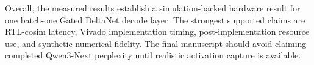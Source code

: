 \begin{table}[t]
\centering
\caption{Recurrent-state storage and off-chip traffic accounting for MXFP4
$B=32$.}
\label{tab:results-state-traffic}

\end{table}

Overall, the measured results establish a simulation-backed hardware result for
one batch-one Gated DeltaNet decode layer. The strongest supported claims are
RTL-cosim latency, Vivado implementation timing, post-implementation resource
use, and synthetic numerical fidelity. The final manuscript should avoid
claiming completed Qwen3-Next perplexity until realistic activation capture is
available.
